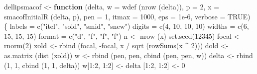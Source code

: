 \documentclass[
  12pt,
]{book}
\newenvironment{Shaded}{\begin{snugshade}}{\end{snugshade}}
\newcommand{\AttributeTok}[1]{\textcolor[rgb]{0.77,0.63,0.00}{#1}}
\newcommand{\ConstantTok}[1]{\textcolor[rgb]{0.00,0.00,0.00}{#1}}
\newcommand{\ControlFlowTok}[1]{\textcolor[rgb]{0.13,0.29,0.53}{\textbf{#1}}}
\newcommand{\DecValTok}[1]{\textcolor[rgb]{0.00,0.00,0.81}{#1}}
\newcommand{\FloatTok}[1]{\textcolor[rgb]{0.00,0.00,0.81}{#1}}
\newcommand{\FunctionTok}[1]{\textcolor[rgb]{0.00,0.00,0.00}{#1}}
\newcommand{\NormalTok}[1]{#1}
\newcommand{\OtherTok}[1]{\textcolor[rgb]{0.56,0.35,0.01}{#1}}
\newcommand{\SpecialCharTok}[1]{\textcolor[rgb]{0.00,0.00,0.00}{#1}}
\newcommand{\StringTok}[1]{\textcolor[rgb]{0.31,0.60,0.02}{#1}}
\theoremstyle{definition}
\theoremstyle{definition}
\theoremstyle{definition}
\theoremstyle{definition}
\theoremstyle{remark}
\begin{document}
\begin{Shaded}
\begin{Highlighting}[]
\NormalTok{dellipsmacof }\OtherTok{\textless{}{-}}
  \ControlFlowTok{function}\NormalTok{ (delta,}
            \AttributeTok{w =} \FunctionTok{wdef}\NormalTok{ (}\FunctionTok{nrow}\NormalTok{ (delta)),}
            \AttributeTok{p =} \DecValTok{2}\NormalTok{,}
            \AttributeTok{x =} \FunctionTok{smacofInitialR}\NormalTok{ (delta, p),}
            \AttributeTok{pen =} \DecValTok{1}\NormalTok{,}
            \AttributeTok{itmax =} \DecValTok{1000}\NormalTok{,}
            \AttributeTok{eps =} \FloatTok{1e{-}6}\NormalTok{,}
            \AttributeTok{verbose =} \ConstantTok{TRUE}\NormalTok{) \{}
\NormalTok{    labels }\OtherTok{=} \FunctionTok{c}\NormalTok{(}\StringTok{"itel"}\NormalTok{, }\StringTok{"sold"}\NormalTok{, }\StringTok{"smid"}\NormalTok{, }\StringTok{"snew"}\NormalTok{)}
\NormalTok{    digits }\OtherTok{=} \FunctionTok{c}\NormalTok{(}\DecValTok{4}\NormalTok{, }\DecValTok{10}\NormalTok{, }\DecValTok{10}\NormalTok{, }\DecValTok{10}\NormalTok{)}
\NormalTok{    widths }\OtherTok{=} \FunctionTok{c}\NormalTok{(}\DecValTok{6}\NormalTok{, }\DecValTok{15}\NormalTok{, }\DecValTok{15}\NormalTok{, }\DecValTok{15}\NormalTok{)}
\NormalTok{    format }\OtherTok{=} \FunctionTok{c}\NormalTok{(}\StringTok{"d"}\NormalTok{, }\StringTok{"f"}\NormalTok{, }\StringTok{"f"}\NormalTok{, }\StringTok{"f"}\NormalTok{)}
\NormalTok{    n }\OtherTok{\textless{}{-}} \FunctionTok{nrow}\NormalTok{ (x)}
    \FunctionTok{set.seed}\NormalTok{(}\DecValTok{12345}\NormalTok{)}
\NormalTok{    focal }\OtherTok{\textless{}{-}} \FunctionTok{rnorm}\NormalTok{(}\DecValTok{2}\NormalTok{)}
\NormalTok{    xold }\OtherTok{\textless{}{-}}
      \FunctionTok{rbind}\NormalTok{ (focal, }\SpecialCharTok{{-}}\NormalTok{focal, x }\SpecialCharTok{/} \FunctionTok{sqrt}\NormalTok{ (}\FunctionTok{rowSums}\NormalTok{(x }\SpecialCharTok{\^{}} \DecValTok{2}\NormalTok{)))}
\NormalTok{    dold }\OtherTok{\textless{}{-}} \FunctionTok{as.matrix}\NormalTok{ (}\FunctionTok{dist}\NormalTok{ (xold))}
\NormalTok{    w }\OtherTok{\textless{}{-}} \FunctionTok{rbind}\NormalTok{ (pen, pen, }\FunctionTok{cbind}\NormalTok{ (pen, pen, w))}
\NormalTok{    delta }\OtherTok{\textless{}{-}} \FunctionTok{rbind}\NormalTok{ (}\DecValTok{1}\NormalTok{, }\DecValTok{1}\NormalTok{, }\FunctionTok{cbind}\NormalTok{ (}\DecValTok{1}\NormalTok{, }\DecValTok{1}\NormalTok{, delta))}
\NormalTok{    w[}\DecValTok{1}\SpecialCharTok{:}\DecValTok{2}\NormalTok{, }\DecValTok{1}\SpecialCharTok{:}\DecValTok{2}\NormalTok{] }\OtherTok{\textless{}{-}}\NormalTok{ delta [}\DecValTok{1}\SpecialCharTok{:}\DecValTok{2}\NormalTok{, }\DecValTok{1}\SpecialCharTok{:}\DecValTok{2}\NormalTok{] }\OtherTok{\textless{}{-}} \DecValTok{0}

\end{Highlighting}
\end{Shaded}
\end{document}
